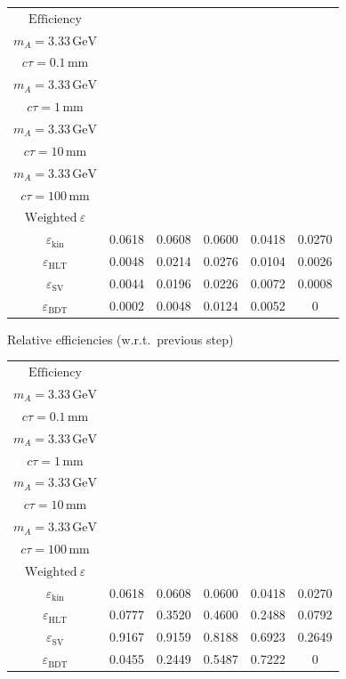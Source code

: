 \documentclass[10pt,a4paper]{article}
\begin{document}
{\begin{tabular}{cccccc}
\toprule
$\mathrm{Efficiency}$ & \shortstack{$m_{\pi}=10\,\mathrm{GeV}$\\$m_{A}=3.33\,\mathrm{GeV}$\\$c\tau=0.1\,\mathrm{mm}$} & \shortstack{$m_{\pi}=10\,\mathrm{GeV}$\\$m_{A}=3.33\,\mathrm{GeV}$\\$c\tau=1\,\mathrm{mm}$} & \shortstack{$m_{\pi}=10\,\mathrm{GeV}$\\$m_{A}=3.33\,\mathrm{GeV}$\\$c\tau=10\,\mathrm{mm}$} & \shortstack{$m_{\pi}=10\,\mathrm{GeV}$\\$m_{A}=3.33\,\mathrm{GeV}$\\$c\tau=100\,\mathrm{mm}$} & \shortstack{$\mathrm{QCD}$\\$\mathrm{Weighted}\ \varepsilon$} \\
\midrule
$\varepsilon_{\mathrm{kin}}$ & 0.0618 & 0.0608 & 0.0600 & 0.0418 & 0.0270\\
$\varepsilon_{\mathrm{HLT}}$ & 0.0048 & 0.0214 & 0.0276 & 0.0104 & 0.0026\\
$\varepsilon_{\mathrm{SV}}$ & 0.0044 & 0.0196 & 0.0226 & 0.0072 & 0.0008\\
$\varepsilon_{\mathrm{BDT}}$ & 0.0002 & 0.0048 & 0.0124 & 0.0052 & $0$\\
\bottomrule
\end{tabular}

\vspace{18pt}

Relative efficiencies (w.r.t.\ previous step)

\begin{tabular}{cccccc}
\toprule
$\mathrm{Efficiency}$ & \shortstack{$m_{\pi}=10\,\mathrm{GeV}$\\$m_{A}=3.33\,\mathrm{GeV}$\\$c\tau=0.1\,\mathrm{mm}$} & \shortstack{$m_{\pi}=10\,\mathrm{GeV}$\\$m_{A}=3.33\,\mathrm{GeV}$\\$c\tau=1\,\mathrm{mm}$} & \shortstack{$m_{\pi}=10\,\mathrm{GeV}$\\$m_{A}=3.33\,\mathrm{GeV}$\\$c\tau=10\,\mathrm{mm}$} & \shortstack{$m_{\pi}=10\,\mathrm{GeV}$\\$m_{A}=3.33\,\mathrm{GeV}$\\$c\tau=100\,\mathrm{mm}$} & \shortstack{$\mathrm{QCD}$\\$\mathrm{Weighted}\ \varepsilon$} \\
\midrule
$\varepsilon_{\mathrm{kin}}$ & 0.0618 & 0.0608 & 0.0600 & 0.0418 & 0.0270\\
$\varepsilon_{\mathrm{HLT}}$ & 0.0777 & 0.3520 & 0.4600 & 0.2488 & 0.0792\\
$\varepsilon_{\mathrm{SV}}$ & 0.9167 & 0.9159 & 0.8188 & 0.6923 & 0.2649\\
$\varepsilon_{\mathrm{BDT}}$ & 0.0455 & 0.2449 & 0.5487 & 0.7222 & $0$\\
\bottomrule
\end{tabular}

}
\end{document}
